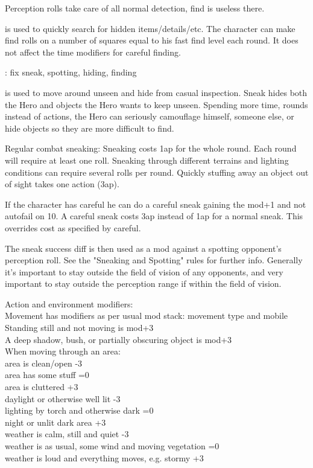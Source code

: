 Perception rolls take care of all normal detection, find is useless there.


 is used to quickly search for hidden items/details/etc. The character can make find rolls on a number of squares equal to his fast find level each round. It does not affect the time modifiers for careful finding.


\TODO: fix sneak, spotting, hiding, finding

 is used to move around unseen and hide from casual inspection. Sneak hides both the Hero and objects the Hero wants to keep unseen. Spending more time, rounds instead of actions, the Hero can seriously camouflage himself, someone else, or hide objects so they are more difficult to find.

Regular combat sneaking: Sneaking costs 1ap for the whole round. Each round will require at least one roll. Sneaking through different terrains and lighting conditions can require several rolls per round. Quickly stuffing away an object out of sight takes one action (3ap).

If the character has careful he can do a careful sneak gaining the mod+1 and not autofail on 10. A careful sneak costs 3ap instead of 1ap for a normal sneak. This overrides cost as specified by careful.

The sneak success diff is then used as a mod against a spotting opponent's perception roll. See the "Sneaking and Spotting" rules for further info.
Generally it's important to stay outside the field of vision of any opponents, and very important to stay outside the perception range if within the field of vision.

Action and environment modifiers:\\
Movement has modifiers as per usual mod stack: movement type and mobile\\
Standing still and not moving is mod+3\\
A deep shadow, bush, or partially obscuring object is mod+3\\

When moving through an area:\\
area is clean/open -3\\
area has some stuff =0\\
area is cluttered +3\\
daylight or otherwise well lit -3\\
lighting by torch and otherwise dark =0\\
night or unlit dark area +3\\
weather is calm, still and quiet -3\\
weather is as usual, some wind and moving vegetation =0\\
weather is loud and everything moves, e.g. stormy  +3

